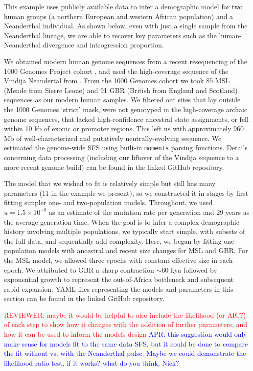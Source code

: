 \documentclass[]{article}
\newcommand{\aprcomment}[1]{{\textcolor{blue}{APR: #1}}}
\newcommand{\reviewercomment}[1]{{\textcolor{red}{REVIEWER: #1}}}
\newcommand{\moments}{\texttt{moments}\xspace}
\begin{document}
This example uses publicly available data to infer a demographic model for two
human groups (a northern European and western African population) and a
Neanderthal individual. As shown below, even with just a single sample from the
Neanderthal lineage, we are able to recover key parameters such as the
human-Neanderthal divergence and introgression proportion.

We obtained modern human genome sequences from a recent resequencing of the 
1000 Genomes Project cohort \cite{byrska2022high}, and used the high-coverage 
sequence of the Vindija Neandertal from \cite{prufer2017high}. 
From the 1000 Genomes cohort we took 85 MSL (Mende from Sierre Leone) and 91 
GBR (British from England and Scotland) sequences as our modern human samples.  
We filtered out sites that lay outside the 1000 Genomes `strict' mask, 
were not genotyped in the high-coverage archaic genome sequences, 
that lacked high-confidence ancestral state assignments, or fell within 10 kb of 
exonic or promoter regions. This left us with approximately 960 Mb of 
well-characterized and putatively neutrally-evolving sequence.
We estimated the genome-wide SFS using built-in \moments parsing functions.
Details concerning data processing (including our liftover of the Vindija 
sequence to a more recent genome build) can be found in the linked GitHub 
repository.

The model that we wished to fit is relatively simple but still has many
parameters ($11$ in the example we present), so we constructed it in stages by
first fitting simpler one- and two-population models.  Throughout, we used
$u=1.5\times 10^{-8}$ as an estimate of the mutation rate per generation and 29
years as the average generation time. When the goal is to infer a complex
demographic history involving multiple populations, we typically start simple,
with subsets of the full data, and sequentially add complexity.  Here, we began
by fitting one-population models with ancestral and recent size changes for MSL
and GBR.  For the MSL model, we allowed three epochs with constant effective
size in each epoch. We attributed to GBR a sharp contraction $\sim$60 kya
followed by exponential growth to represent the out-of-Africa bottleneck and
subsequent rapid expansion. YAML files representing the models and parameters
in this section can be found in the linked GitHub repository.

\reviewercomment{maybe it would be helpful to also include the likelihood (or AIC?) of each step to show how it changes with the addition of further parameters, and how it can be used to inform the models design}
\aprcomment{this suggestion would only make sense for models fit to the same data SFS, but it could be done to compare the fit without vs. with the Neanderthal pulse. Maybe we could demonstrate the likelihood ratio test, if it works? what do you think, Nick?}
\end{document}
